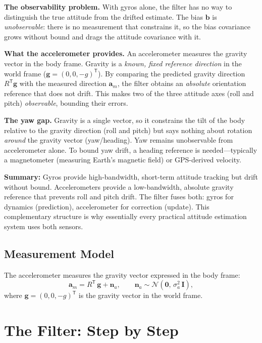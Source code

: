 \documentclass[11pt,letterpaper]{article}
\newcommand{\eye}{\mathbf{I}}
\begin{document}
\textbf{The observability problem.}  With gyros alone, the filter
has no way to distinguish the true attitude from the drifted
estimate.  The bias $\mathbf{b}$ is \emph{unobservable}: there is
no measurement that constrains it, so the bias covariance grows
without bound and drags the attitude covariance with it.

\textbf{What the accelerometer provides.}  An accelerometer
measures the gravity vector in the body frame.  Gravity is a
\emph{known, fixed reference direction} in the world frame
($\mathbf{g} = (0, 0, -g)^{\mathsf{T}}$).  By comparing the
predicted gravity direction $R^{\mathsf{T}}\mathbf{g}$ with the
measured direction $\mathbf{a}_m$, the filter obtains an
\emph{absolute} orientation reference that does not drift.  This
makes two of the three attitude axes (roll and pitch)
\emph{observable}, bounding their errors.

\textbf{The yaw gap.}  Gravity is a single vector, so it
constrains the tilt of the body relative to the gravity direction
(roll and pitch) but says nothing about rotation \emph{around}
the gravity vector (yaw/heading).  Yaw remains unobservable
from accelerometer alone.  To bound yaw drift, a heading
reference is needed---typically a magnetometer (measuring Earth's
magnetic field) or GPS-derived velocity.

\textbf{Summary:}  Gyros provide high-bandwidth, short-term
attitude tracking but drift without bound.  Accelerometers provide
a low-bandwidth, absolute gravity reference that prevents roll and
pitch drift.  The filter fuses both: gyros for dynamics (prediction),
accelerometer for correction (update).  This complementary structure
is why essentially every practical attitude estimation system uses
both sensors.

\subsection{Measurement Model}

The accelerometer measures the gravity vector expressed in the body
frame:
\[
  \mathbf{a}_m
  = R^{\mathsf{T}}\,\mathbf{g} + \mathbf{n}_{a},
  \qquad
  \mathbf{n}_{a} \sim \mathcal{N}(\mathbf{0},\,
  \sigma_{a}^{2}\,\eye),
\]
where $\mathbf{g} = (0, 0, -g)^{\mathsf{T}}$ is the gravity
vector in the world frame.

\newpage
\section{The Filter: Step by Step}
\end{document}
